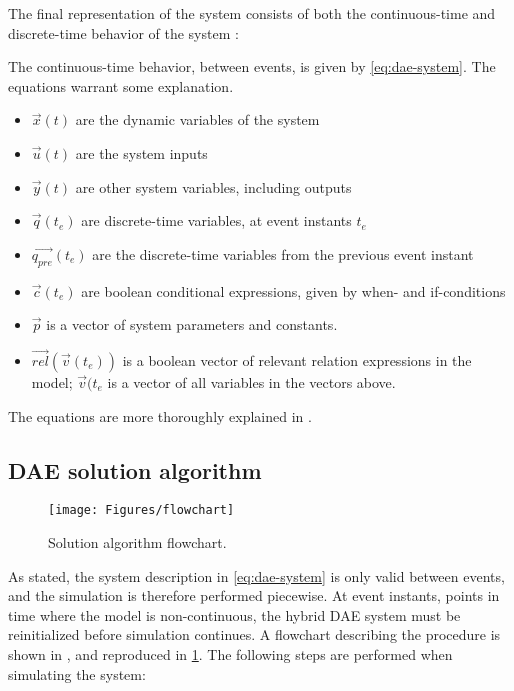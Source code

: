 \documentclass[\rootfolder/main.tex]{subfiles}
\begin{document}
The final representation of the system consists of both the continuous-time and discrete-time behavior of the system \cite{openmodelica.org:lundvall:sims:2005}:


The continuous-time behavior, between events, is given by \cref{eq:dae-system}.
The equations warrant some explanation.

\begin{itemize}[noitemsep]
    \item $\vec{x}(t)$ are the dynamic variables of the system
    \item $\vec{u}(t)$ are the system inputs
    \item $\vec{y}(t)$ are other system variables, including outputs
    \item $\vec{q}(t_{e})$ are discrete-time variables, at event instants $t_{e}$
    \item $\vec{q_{pre}}(t_{e})$ are the discrete-time variables from the previous event instant
    \item $\vec{c}(t_{e})$ are boolean conditional expressions, given by when- and if-conditions
    \item $\vec{p}$ is a vector of system parameters and constants.
    \item $\vec{rel}(\vec{v}(t_{e}))$ is a boolean vector of relevant relation expressions in the model; $\vec{v}(t_{e}$ is a vector of all variables in the vectors above.
\end{itemize}

The equations are more thoroughly explained in \cite{openmodelica.org:lundvall:sims:2005}.

\subsection{DAE solution algorithm}

\begin{figure}[H]
    \centering
    \texttt{[image: Figures/flowchart]}
    \caption{Solution algorithm flowchart.\label{fig:dae-flowchart}}
\end{figure}

As stated, the system description in \cref{eq:dae-system} is only valid between events, and the simulation is therefore performed piecewise.
At event instants, points in time where the model is non-continuous, the hybrid DAE system must be reinitialized before simulation continues.
A flowchart describing the procedure is shown in \cite{openmodelica.org:lundvall:sims:2005}, and reproduced in \cref{fig:dae-flowchart}.
The following steps are performed when simulating the system:
\end{document}
